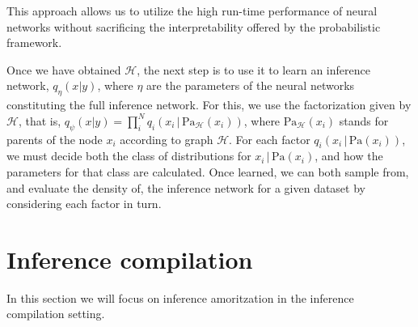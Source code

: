 \documentclass[12pt]{article}
\begin{document}
This approach allows us to utilize the high run-time performance of neural networks 
without sacrificing the interpretability offered by the probabilistic framework.


Once we have obtained $\mathcal{H}$, the next step is to use it to learn an inference network, $q_\eta(x|y)$, where $\eta$ are the parameters of the neural networks constituting the full inference network. 
For this, we use the factorization given by $\mathcal{H}$, that is, $q_\psi(x|y)=\prod^N_i q_i(x_i\,|\,\text{Pa}_\mathcal{H}(x_i))$, where $\text{Pa}_\mathcal{H}(x_i)$ stands for parents of the node $x_i$ according to graph $\mathcal{H}$.
For each factor $q_i(x_i\,|\,\text{Pa}(x_i))$, we must decide both the class of distributions for $x_i\,|\,\text{Pa}(x_i)$, and how the parameters for that class are calculated.
Once learned, we can both sample from, and evaluate the density of, the inference network for a given dataset by considering each factor in turn.


\section{Inference compilation}
\label{sec:inf-comp}

In this section we will focus on inference amoritzation in the inference compilation setting.



\end{document}
